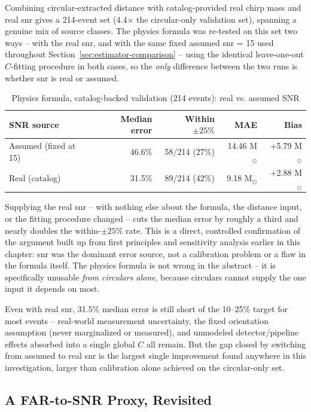 Combining circular-extracted distance with catalog-provided real chirp mass and real \gls{snr} gives a 214-event set (4.4$\times$ the circular-only validation set), spanning a genuine mix of source classes. The physics formula was re-tested on this set two ways -- with the real \gls{snr}, and with the same fixed assumed \gls{snr} = 15 used throughout Section~\ref{sec:estimator-comparison} -- using the identical leave-one-out $C$-fitting procedure in both cases, so the \emph{only} difference between the two runs is whether \gls{snr} is real or assumed.

\begin{table}[H]
\centering
\caption{Physics formula, catalog-backed validation (214 events): real vs. assumed SNR}
\label{tab:catalog-results}
\begin{tabular}{@{}lrrrr@{}}
\toprule
SNR source & Median error & Within $\pm25\%$ & MAE & Bias \\
\midrule
Assumed (fixed at 15) & 46.6\% & 58/214 (27\%) & 14.46 M$_\odot$ & +5.79 M$_\odot$ \\
Real (catalog) & 31.5\% & 89/214 (42\%) & 9.18 M$_\odot$ & +2.88 M$_\odot$ \\
\bottomrule
\end{tabular}
\end{table}

Supplying the real \gls{snr} -- with nothing else about the formula, the distance input, or the fitting procedure changed -- cuts the median error by roughly a third and nearly doubles the within-$\pm25\%$ rate. This is a direct, controlled confirmation of the argument built up from first principles and sensitivity analysis earlier in this chapter: \gls{snr} was the dominant error source, not a calibration problem or a flaw in the formula itself. The physics formula is not wrong in the abstract -- it is specifically unusable \emph{from circulars alone}, because circulars cannot supply the one input it depends on most.

Even with real \gls{snr}, 31.5\% median error is still short of the 10--25\% target for most events -- real-world measurement uncertainty, the fixed orientation assumption (never marginalized or measured), and unmodeled detector/pipeline effects absorbed into a single global $C$ all remain. But the gap closed by switching from assumed to real \gls{snr} is the largest single improvement found anywhere in this investigation, larger than calibration alone achieved on the circular-only set.

\subsection{A FAR-to-SNR Proxy, Revisited}

